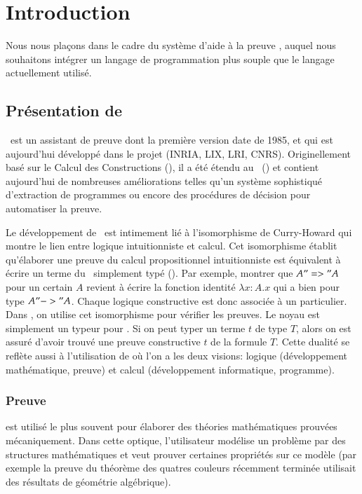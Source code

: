 \chapter{Introduction}
Nous nous pla\c cons dans le cadre du syst\`eme d'aide \`a la preuve \Coq{},
auquel nous souhaitons int\'egrer un langage de programmation plus souple
que le langage actuellement utilis\'e.

\section{Pr\'esentation de \Coq}

\Coq~est un assistant de preuve dont la premi\`ere version date de 1985,
et qui est aujourd'hui d\'evelopp\'e dans le projet \PCRI{} \LogiCal{} (INRIA, LIX,
LRI, CNRS). Originellement bas\'e sur le Calcul des Constructions (\CoC),
il a \'et\'e \'etendu au \CCIfull~(\CCI) et contient aujourd'hui de
nombreuses am\'eliorations telles qu'un syst\`eme sophistiqu\'e d'extraction
de programmes ou encore des proc\'edures de d\'ecision pour automatiser la
preuve.

Le d\'eveloppement de \Coq~est intimement li\'e \`a l'isomorphisme de {\sc
Curry-Howard} qui montre le lien entre logique intuitionniste et calcul. Cet
isomorphisme \'etablit qu'\'elaborer une preuve du calcul propositionnel
intuitionniste est \'equivalent \`a \'ecrire un terme du
\lc~simplement typ\'e (\lcst). Par exemple, montrer que $A "=>" A$ pour un
certain $A$ revient \`a \'ecrire la fonction identit\'e $\lambda x : A. x$ qui
a bien pour type $A "->" A$. Chaque logique constructive est donc
associ\'ee \`a un \lc{} particulier. Dans \Coq{}, on utilise cet
isomorphisme pour v\'erifier les preuves. Le noyau est simplement un
typeur pour \CCI{}. Si on peut typer un terme $t$ de type $T$, alors on est
assur\'e d'avoir trouv\'e une preuve constructive $t$ de la formule $T$.
Cette dualit\'e se refl\`ete aussi \`a l'utilisation de \Coq{} o\`u l'on a 
les deux visions: logique (d\'eveloppement math\'ematique, preuve) et 
calcul (d\'eveloppement informatique, programme).

\subsection{Preuve}
\Coq{} est utilis\'e le plus souvent pour \'elaborer des th\'eories
math\'ematiques prouv\'ees m\'ecaniquement. Dans cette optique, l'utilisateur 
mod\'elise un probl\`eme par des structures math\'ematiques et veut prouver
certaines propri\'et\'es sur ce mod\`ele (par exemple la preuve du th\'eor\`eme
des quatres couleurs r\'ecemment termin\'ee \cite{Gonthier4col} utilisait 
des r\'esultats de g\'eom\'etrie alg\'ebrique).

